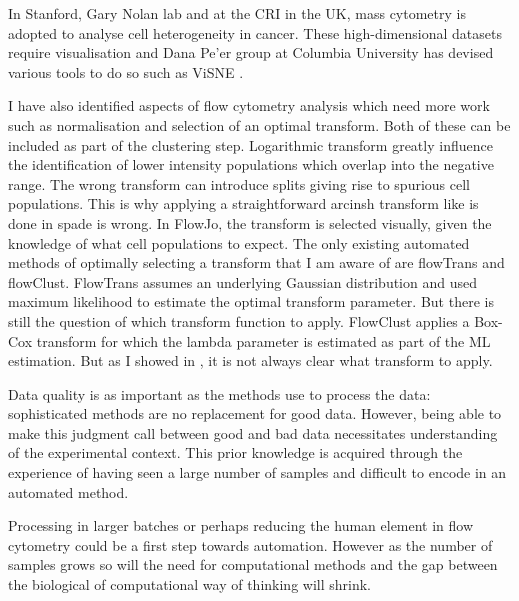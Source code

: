 In Stanford, Gary Nolan lab and at the CRI in the UK, mass cytometry is adopted to analyse cell heterogeneity in cancer.
These high-dimensional datasets require visualisation and Dana Pe'er group at Columbia University has devised various tools to do so such as ViSNE \citep{Amir:2013jp}.

I have also identified aspects of flow cytometry analysis which need more work such as normalisation and selection of an optimal transform.
Both of these can be included as part of the clustering step.
Logarithmic transform greatly influence the identification of lower intensity populations which overlap into the negative range.
The wrong transform can introduce splits giving rise to spurious cell populations.
This is why applying a straightforward arcinsh transform like is done in spade is wrong.
In FlowJo, the transform is selected visually, given the knowledge of what cell populations to expect.
The only existing automated  methods of optimally selecting a transform that I am aware of are flowTrans and flowClust.
FlowTrans assumes an underlying Gaussian distribution and used maximum likelihood to estimate the optimal transform parameter.
But there is still the question of which transform function to apply.
FlowClust applies a Box-Cox transform for which the lambda parameter is estimated as part of the ML estimation.
But as I showed in , it is not always clear what transform to apply.


Data quality is as important as the methods use to process the data: sophisticated methods are no replacement for good data.
However, being able to make this judgment call between good and bad data necessitates understanding of the experimental context.
This prior knowledge is acquired through the experience of having seen a large number of samples and difficult to encode in an automated method.

Processing in larger batches or perhaps reducing the human element in flow cytometry could be a first step towards automation.
However as the number of samples grows so will the need for computational methods and the gap between the biological of computational way of thinking will shrink.

